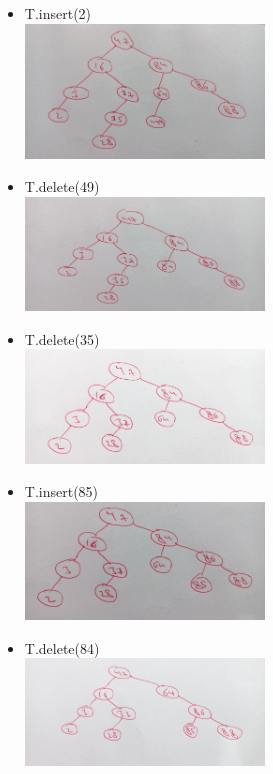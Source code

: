 \documentclass[12pt,twoside]{article}
\begin{document}
\begin{problems}
\begin{problemparts}
\begin{itemize}
    \item T.insert(2) \\ 
    \includegraphics[width=0.5\textwidth]{1b1.jpg} \\
    \item T.delete(49) \\
    \includegraphics[width=0.5\textwidth]{1b2.jpg} \\
    \newpage
    \item T.delete(35) \\
    \includegraphics[width=0.5\textwidth]{1b3.jpg} \\
    \item T.insert(85) \\
    \includegraphics[width=0.5\textwidth]{1b4.jpg} \\
    \item T.delete(84) \\
    \includegraphics[width=0.5\textwidth]{1b5.jpg}
\end{itemize}


\end{problemparts}
\end{problems}
\end{document}
